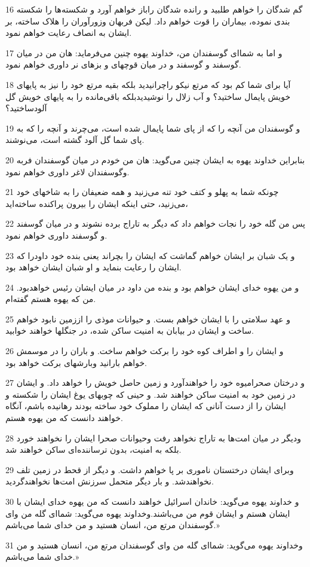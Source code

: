 \par 16 گم شدگان را خواهم طلبید و رانده شدگان راباز خواهم آورد و شکسته‌ها را شکسته بندی نموده، بیماران را قوت خواهم داد. لیکن فربهان وزورآوران را هلاک ساخته، بر ایشان به انصاف رعایت خواهم نمود.
\par 17 و اما به شما‌ای گوسفندان من، خداوند یهوه چنین می‌فرماید: هان من در میان گوسفند و گوسفند و در میان قوچهای و بزهای نر داوری خواهم نمود.
\par 18 آیا برای شما کم بود که مرتع نیکو راچرانیدید بلکه بقیه مرتع خود را نیز به پایهای خویش پایمال ساختید؟ و آب زلال را نوشیدیدبلکه باقی‌مانده را به پایهای خویش گل آلودساختید؟
\par 19 و گوسفندان من آنچه را که از پای شما پایمال شده است، می‌چرند و آنچه را که به پای شما گل آلود گشته است، می‌نوشند.
\par 20 بنابراین خداوند یهوه به ایشان چنین می‌گوید: هان من خودم در میان گوسفندان فربه وگوسفندان لاغر داوری خواهم نمود.
\par 21 چونکه شما به پهلو و کتف خود تنه می‌زنید و همه ضعیفان را به شاخهای خود می‌زنید، حتی اینکه ایشان را بیرون پراکنده ساخته‌اید،
\par 22 پس من گله خود را نجات خواهم داد که دیگر به تاراج برده نشوند و در میان گوسفند و گوسفند داوری خواهم نمود.
\par 23 و یک شبان بر ایشان خواهم گماشت که ایشان را بچراند یعنی بنده خود داودرا که ایشان را رعایت بنماید و او شبان ایشان خواهد بود.
\par 24 و من یهوه خدای ایشان خواهم بود و بنده من داود در میان ایشان رئیس خواهدبود. من که یهوه هستم گفته‌ام.
\par 25 و عهد سلامتی را با ایشان خواهم بست. و حیوانات موذی را اززمین نابود خواهم ساخت و ایشان در بیابان به امنیت ساکن شده، در جنگلها خواهند خوابید.
\par 26 و ایشان را و اطراف کوه خود را برکت خواهم ساخت. و باران را در موسمش خواهم بارانید وبارشهای برکت خواهد بود.
\par 27 و درختان صحرامیوه خود را خواهند‌آورد و زمین حاصل خویش را خواهد داد. و ایشان در زمین خود به امنیت ساکن خواهند شد. و حینی که چوبهای یوغ ایشان را شکسته و ایشان را از دست آنانی که ایشان را مملوک خود ساخته بودند رهانیده باشم، آنگاه خواهند دانست که من یهوه هستم.
\par 28 ودیگر در میان امت‌ها به تاراج نخواهد رفت وحیوانات صحرا ایشان را نخواهند خورد بلکه به امنیت، بدون ترساننده‌ای ساکن خواهند شد.
\par 29 وبرای ایشان درختستان ناموری بر پا خواهم داشت. و دیگر از قحط در زمین تلف نخواهندشد. و بار دیگر متحمل سرزنش امت‌ها نخواهندگردید.
\par 30 و خداوند یهوه می‌گوید: خاندان اسرائیل خواهند دانست که من یهوه خدای ایشان با ایشان هستم و ایشان قوم من می‌باشند.وخداوند یهوه می‌گوید: شما‌ای گله من و‌ای گوسفندان مرتع من، انسان هستید و من خدای شما می‌باشم.»
\par 31 وخداوند یهوه می‌گوید: شما‌ای گله من و‌ای گوسفندان مرتع من، انسان هستید و من خدای شما می‌باشم.»

